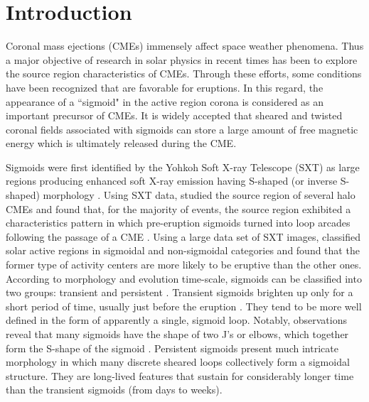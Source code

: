 \documentclass[twocolumn]{aastex6}
\begin{document}

\section{Introduction}
Coronal mass ejections (CMEs) immensely affect space weather phenomena. Thus a major objective of research in solar physics in recent times has been to explore the source region characteristics of CMEs. Through these efforts, some conditions have been recognized that are favorable for eruptions. In this regard, the appearance of a ``sigmoid" in the active region corona is considered as an important precursor of CMEs. It is widely accepted that sheared and twisted coronal fields associated with sigmoids can store a large amount of free magnetic energy which is ultimately released during the CME. 

Sigmoids were first identified by the Yohkoh Soft X-ray Telescope (SXT) as large regions producing enhanced soft X-ray emission having S-shaped (or inverse S-shaped) morphology \citep{Rust1996, Manoharan1996,Pevtsov1996,Sterling1997,Moore2001}. Using SXT data, \cite{Hudson1998} studied the source region of several halo CMEs and found that, for the majority of events, the source region exhibited a characteristics pattern in which pre-eruption sigmoids turned into loop arcades following the passage of a CME \citep[see also][]{Sterling2000}. Using a large data set of SXT images, \cite{Canfield1999} classified solar active regions in sigmoidal and non-sigmoidal categories and found that the former type of activity centers are more likely to be eruptive than the other ones. According to morphology and evolution time-scale, sigmoids can be classified into two groups: transient and persistent \citep{Gibson2006}. Transient sigmoids brighten up only for a short period of time, usually just before the eruption \citep[see, e.g., ][]{Pevtsov1996}. They tend to be more well defined in the form of apparently a single, sigmoid loop. Notably, observations reveal that many sigmoids have the shape of two J's or elbows, which together form the S-shape of the sigmoid \citep[see, e.g.,][]{Moore2001}. Persistent sigmoids present much intricate morphology in which many discrete sheared loops collectively form a sigmoidal structure. They are long-lived features that sustain for considerably longer time than the transient sigmoids (from days to weeks)\citep[see, e.g., ][]{McKenzie2008}.  
\end{document}
